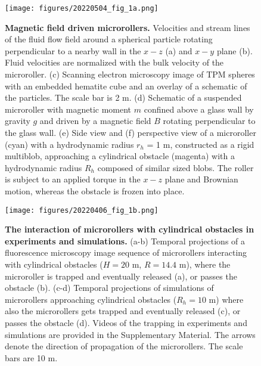 \documentclass[12pt]{article}
\begin{document}




\newpage
\begin{figure}
 \centering
 \texttt{[image: figures/20220504\_fig\_1a.png]}
\caption{
\label{fig:setup}
\textbf{Magnetic field driven microrollers.} Velocities and stream lines of the fluid flow field around a spherical particle rotating perpendicular to a nearby wall in the $x-z$ (a) and $x-y$ plane (b). Fluid velocities are normalized with the bulk velocity of the microroller.
(c) Scanning electron microscopy image of TPM spheres with an embedded hematite cube and an overlay of a schematic of the particles. The scale bar is 2 \textmu m.
(d) Schematic of a suspended microroller with magnetic moment $m$ confined above a glass wall by gravity $g$ and driven by a magnetic field $B$ rotating perpendicular to the glass wall. 
(e) Side view and (f) perspective view of a microroller (cyan)
with a hydrodynamic radius $r_h$ = 1 \textmu m, constructed as a rigid multiblob, approaching a cylindrical obstacle (magenta) with
a hydrodynamic radius $R_h$ composed of similar sized blobs. The roller is subject to an applied torque in the $x-z$ plane and Brownian motion, whereas the obstacle is frozen into place.}
\end{figure}
 
\begin{figure}
\centering
\texttt{[image: figures/20220406\_fig\_1b.png]}
\caption{
\label{fig:trapping}
\textbf{The interaction of microrollers with cylindrical obstacles in experiments and simulations.}
(a-b) Temporal projections of a fluorescence microscopy image sequence of microrollers interacting with cylindrical obstacles ($H=20$ \textmu m, $R=14.4$ \textmu m), where the microroller is trapped and eventually released (a), or passes the obstacle (b). 
(c-d) Temporal projections of simulations of microrollers approaching cylindrical obstacles ($R_h=10$ \textmu m) where also the microrollers gets trapped and eventually released (c), or passes the obstacle (d).
Videos of the trapping in experiments and simulations are provided in the Supplementary Material.
The arrows denote the direction of propagation of the microrollers.
The scale bars are 10 \textmu m.}
\end{figure}
\end{document}
